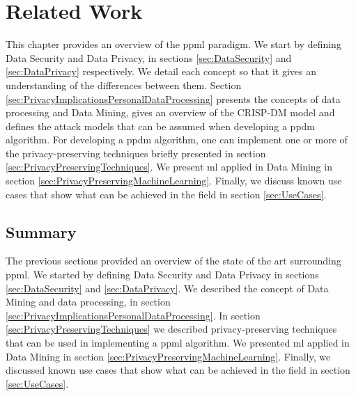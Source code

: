 %

\acresetall

\chapter{Related Work}
\label{ch:RelatedWork}


This chapter provides an overview of the \ac{ppml} paradigm.
We start by defining Data Security and Data Privacy, in sections \ref{sec:DataSecurity} and \ref{sec:DataPrivacy} respectively. We detail each concept so that it gives an understanding of the differences between them.
Section \ref{sec:PrivacyImplicationsPersonalDataProcessing} presents the concepts of data processing and Data Mining, gives an overview of the CRISP-DM model and defines the attack models that can be assumed when developing a \ac{ppdm} algorithm.
For developing a \ac{ppdm} algorithm, one can implement one or more of the privacy-preserving techniques briefly presented in section \ref{sec:PrivacyPreservingTechniques}. 
We present \ac{ml} applied in Data Mining in section \ref{sec:PrivacyPreservingMachineLearning}. Finally, we discuss known use cases that show what can be achieved in the field in section \ref{sec:UseCases}.









\section{Summary}
\label{sec:SummaryRelatedWork}

The previous sections provided an overview of the state of the art surrounding \ac{ppml}.
We started by defining Data Security and Data Privacy in sections \ref{sec:DataSecurity} and \ref{sec:DataPrivacy}.
We described the concept of Data Mining and data processing, in section \ref{sec:PrivacyImplicationsPersonalDataProcessing}.
In section \ref{sec:PrivacyPreservingTechniques} we described privacy-preserving techniques that can be used in implementing a \ac{ppml} algorithm.
We presented \ac{ml} applied in Data Mining in section \ref{sec:PrivacyPreservingMachineLearning}. Finally, we discussed known use cases that show what can be achieved in the field in section \ref{sec:UseCases}.


